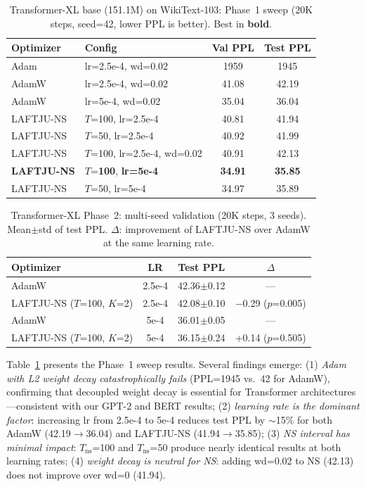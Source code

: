 \documentclass[10pt,twocolumn]{article}
\newcommand{\method}{LAFTJU}
\begin{document}
\begin{table}[t]
\centering
\caption{Transformer-XL base (151.1M) on WikiText-103: Phase~1 sweep (20K steps, seed=42, lower PPL is better). Best in \textbf{bold}.}
\label{tab:txl_phase1}
\small
\begin{tabular}{@{}llcc@{}}
\toprule
\textbf{Optimizer} & \textbf{Config} & \textbf{Val PPL} & \textbf{Test PPL} \\
\midrule
Adam & lr=2.5e-4, wd=0.02 & 1959 & 1945 \\
\midrule
AdamW & lr=2.5e-4, wd=0.02 & 41.08 & 42.19 \\
AdamW & lr=5e-4, wd=0.02 & 35.04 & 36.04 \\
\midrule
\method{}-NS & $T$=100, lr=2.5e-4 & 40.81 & 41.94 \\
\method{}-NS & $T$=50, lr=2.5e-4 & 40.92 & 41.99 \\
\method{}-NS & $T$=100, lr=2.5e-4, wd=0.02 & 40.91 & 42.13 \\
\textbf{\method{}-NS} & $T$=\textbf{100}, \textbf{lr=5e-4} & \textbf{34.91} & \textbf{35.85} \\
\method{}-NS & $T$=50, lr=5e-4 & 34.97 & 35.89 \\
\bottomrule
\end{tabular}
\end{table}

\begin{table}[t]
\centering
\caption{Transformer-XL Phase~2: multi-seed validation (20K steps, 3 seeds). Mean$\pm$std of test PPL. $\Delta$: improvement of \method{}-NS over AdamW at the same learning rate.}
\label{tab:txl_phase2}
\small
\begin{tabular}{@{}lccc@{}}
\toprule
\textbf{Optimizer} & \textbf{LR} & \textbf{Test PPL} & \textbf{$\Delta$} \\
\midrule
AdamW & 2.5e-4 & 42.36$\pm$0.12 & --- \\
\method{}-NS ($T$=100, $K$=2) & 2.5e-4 & 42.08$\pm$0.10 & $-$0.29 ($p$=0.005) \\
\midrule
AdamW & 5e-4 & 36.01$\pm$0.05 & --- \\
\method{}-NS ($T$=100, $K$=2) & 5e-4 & 36.15$\pm$0.24 & +0.14 ($p$=0.505) \\
\bottomrule
\end{tabular}
\end{table}

Table~\ref{tab:txl_phase1} presents the Phase~1 sweep results. Several findings emerge: (1) \emph{Adam with L2 weight decay catastrophically fails} (PPL=1945 vs.\ 42 for AdamW), confirming that decoupled weight decay is essential for Transformer architectures---consistent with our GPT-2 and BERT results; (2) \emph{learning rate is the dominant factor}: increasing lr from 2.5e-4 to 5e-4 reduces test PPL by $\sim$15\% for both AdamW (42.19$\to$36.04) and \method{}-NS (41.94$\to$35.85); (3) \emph{NS interval has minimal impact}: $T_\mathrm{ns}$=100 and $T_\mathrm{ns}$=50 produce nearly identical results at both learning rates; (4) \emph{weight decay is neutral for NS}: adding wd=0.02 to NS (42.13) does not improve over wd=0 (41.94).
\end{document}
